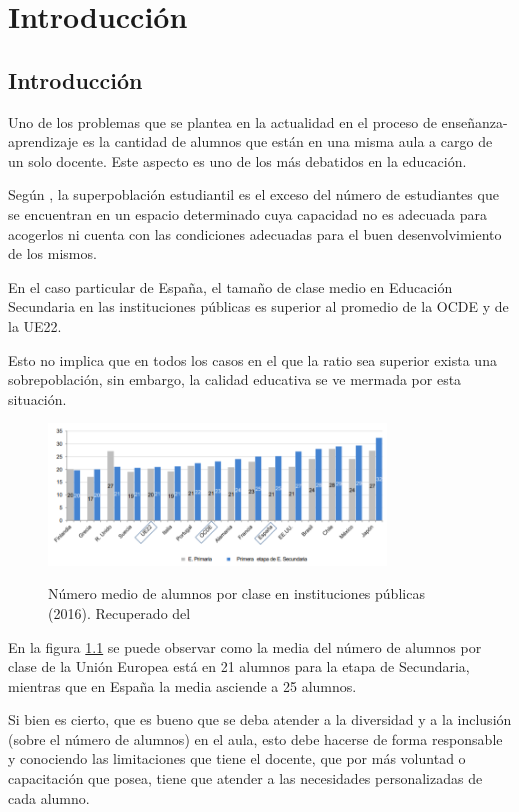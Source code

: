 \chapter{Introducción}
\section{Introducción}
Uno de los problemas que se plantea en la actualidad en el proceso de enseñanza-aprendizaje es la cantidad de alumnos que están en una misma aula a cargo de un solo docente. Este aspecto es uno de los más debatidos en la educación. \cite{PANORAMA2018}

Según , la superpoblación estudiantil es el exceso del número de estudiantes que se encuentran en un espacio determinado cuya capacidad no es adecuada para acogerlos ni cuenta con las condiciones adecuadas para el buen desenvolvimiento de los mismos.

En el caso particular de España, el tamaño de clase medio en Educación Secundaria en las instituciones públicas es superior al promedio de la OCDE y de la UE22. \cite{PANORAMA2018}

Esto no implica que en todos los casos en el que la ratio sea superior exista una sobrepoblación, sin embargo, la calidad educativa se ve mermada por esta situación.

\begin{figure}[htb]
	\centering
	\caption{Número medio de alumnos por clase en instituciones públicas (2016). Recuperado del \protect{}}
	\includegraphics[width=0.8\textwidth]{recursos/NumeroAlumnosClase}
	\label{fig:NumeroAlumnosClase}
\end{figure}
\FloatBarrier

En la figura \ref{fig:NumeroAlumnosClase} se puede observar como la media del número de alumnos por clase de la Unión Europea está en 21 alumnos para la etapa de Secundaria, mientras que en España la media asciende a 25 alumnos.

Si bien es cierto, que es bueno que se deba atender a la diversidad y a la inclusión (sobre el número de alumnos) en el aula, esto debe hacerse de forma responsable y conociendo las limitaciones que tiene el docente, que por más voluntad o capacitación que posea, tiene que atender a las necesidades personalizadas de cada alumno. \cite{HILDA2014}

